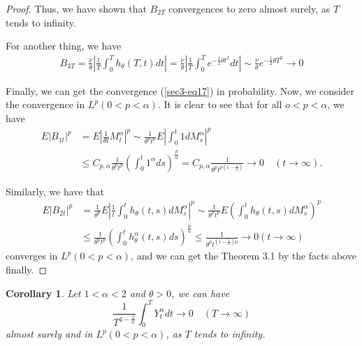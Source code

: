 \documentclass[11pt]{amsart}
\theoremstyle{plain}
\newtheorem{cor}{Corollary}[section]
\numberwithin{equation}{section}
\begin{document}
\begin{proof}
Thus, we have shown that $B_{2T}$ convergences to zero almost surely, as $T$ tends to infinity.

For another thing, we have
\begin{equation*}
\begin{aligned}
B_{3T}=\frac{\nu}{\theta}\left|\frac{1}{T}\int_0^T h_\theta(T,t)dt\right|=\frac{\nu}{\theta}\left|\frac{1}{T}\int_0^T e^{-\frac{1}{2}\theta t^2} dt\right|\sim \frac{\nu}{\theta}e^{-\frac{1}{2}\theta T^2} \longrightarrow 0
\end{aligned}
\end{equation*}

Finally, we can get the convergence (\ref{sec3-eq17}) in probability. Now, we consider the convergence in $L^p(0<p<\alpha)$. It is clear to see that for all $o<p<\alpha$, we have
\begin{equation*}
\begin{aligned}
E|B_{1t}|^p&=E|\frac{1}{\theta t}M_t^\alpha|^p\sim \frac{1}{\theta^p t^p}E\left|\int_0^t 1dM_s^\alpha\right|^p \\
&\leq C_{p,\alpha} \frac{1}{\theta^p t^p}\left (\int_0^t 1^\alpha ds\right)^{\frac{p}{\alpha}}=C_{p,\alpha}\frac{1}{\theta^p t^{p(1-\frac{1}{\alpha})}}\longrightarrow 0 \quad(t\rightarrow\infty).
\end{aligned}
\end{equation*}

Similarly, we have that
\begin{equation*}
\begin{aligned}
E|B_{2t}|^p&=\frac{1}{\theta^p}E\left|\frac{1}{t}\int_0^t h_\theta(t,s)dM_s^\alpha\right|^p\sim \frac{1}{\theta^p t^p}E\left(\int_0^t h_\theta(t,s)dM_s^\alpha\right)^p\\
&\leq \frac{1}{\theta^p t^p}\left(\int_0^t h^\alpha_\theta(t,s) ds\right)^{\frac{p}{\alpha}}\leq \frac{1}{\theta^p t^{(1-\frac{1}{\alpha})p}}\longrightarrow 0(t\rightarrow \infty)
\end{aligned}
\end{equation*}
converges in $L^p(0<p<\alpha)$, and we can get the Theorem 3.1 by the facts above finally.
\end{proof}

\begin{cor}
Let $1<\alpha<2$ and $\theta>0$, we can have 
\begin{equation}\label{sec3-eq18}
\frac{1}{T^{4-\frac{2}{\alpha}}}\int_0^T Y_t^\alpha dt\longrightarrow0\quad(T\rightarrow\infty)
\end{equation}  
almost surely and in $L^p(0<p<\alpha)$, as $T$ tends to infinity.
\end{cor}
\end{document}

